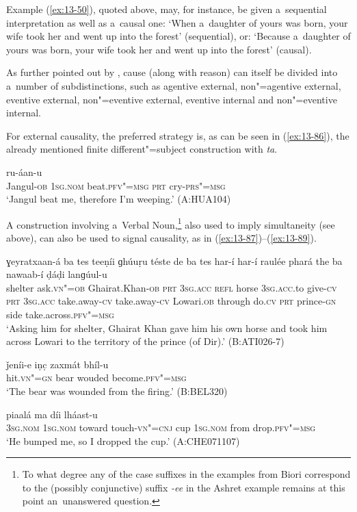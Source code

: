 Example (\ref{ex:13-50}), quoted above, may, for instance, be given a~sequential interpretation as well as a~causal one: `When a~daughter of yours was born, your wife took her and went up into the forest' (sequential), or: `Because a~daughter of yours was born, your wife took her and went up into the forest' (causal).



As further pointed out by \citet[335]{givon2001b}, cause (along with reason) can itself be divided into a~number of subdistinctions, such as agentive external, non"=agentive external, eventive external, non"=eventive external, eventive internal and non"=eventive internal.



For external causality, the preferred strategy is, as can be seen in (\ref{ex:13-86}), the already mentioned finite different"=subject construction with \textit{ta}.

\begin{exe}
\ex
\label{ex:13-86}
 ru-áan-u  \\
Jangul-\textsc{ob} \textsc{1sg.nom} beat.\textsc{pfv"=msg} \textsc{prt} cry-\textsc{prs"=msg}  \\
\glt `Jangul beat me, therefore I'm weeping.' (A:HUA104)
\end{exe}

A construction involving a~Verbal Noun,\footnote{To what degree any of the case suffixes in the examples from Biori correspond to the (possibly conjunctive) suffix \textit{-ee} in the Ashret example remains at this point an~unanswered question.} also used to imply simultaneity (see above), can also be used to signal causality, as in (\ref{ex:13-87})--(\ref{ex:13-89}).

\begin{exe}
\ex
\label{ex:13-87}
 ɣeyratxaan-á ba tes teeṇíi ɡhúuṛu téste de ba tes har-í har-í raulée phará the ba nawaab-í ḍáḍi lanɡúul-u \\
shelter ask.\textsc{vn"=ob} Ghairat.Khan-\textsc{ob} \textsc{prt} \textsc{3sg.acc} \textsc{refl}  horse \textsc{3sg.acc.}to give-\textsc{cv} \textsc{prt} \textsc{3sg.acc} take.away-\textsc{cv} take.away-\textsc{cv} Lowari.\textsc{ob} through do.\textsc{cv} \textsc{prt} prince-\textsc{gn} side take.across.\textsc{pfv"=msg} \\
\glt `Asking him for shelter, Ghairat Khan gave him his own horse and took him across Lowari to the territory of the prince (of Dir).' (B:ATI026-7)

\ex
\label{ex:13-88}
\gll ǰeníi-e iṇc̣ zaxmát bhíl-u \\
hit.\textsc{vn"=gn} bear wouded become.\textsc{pfv"=msg} \\
\glt `The bear was wounded from the firing.' (B:BEL320)

\ex
\label{ex:13-89}
\gll [so ma pharé ḍhak"=ainíi-ee] piaalá ma díi lháast-u \\
\textsc{3sg.nom} \textsc{1sg.nom} toward touch-\textsc{vn"=cnj} cup \textsc{1sg.nom} from drop.\textsc{pfv"=msg}  \\
\glt `He bumped me, so I dropped the cup.' (A:CHE071107) 
\end{exe}

